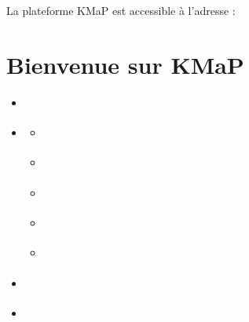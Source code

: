 \documentclass[letterpaper,10pt,english]{sphinxmanual}
\begin{document}
\sphinxAtStartPar
La plateforme KMaP est accessible à l’adresse : 

\sphinxstepscope


\section{Bienvenue sur KMaP}
\label{\detokenize{fr/01_bienvenue:bienvenue-sur-kmap}}\label{\detokenize{fr/01_bienvenue:welcome-fr}}\label{\detokenize{fr/01_bienvenue::doc}}
\begin{sphinxcontents}
\begin{itemize}
\item {} 
\sphinxAtStartPar
{}\label{\detokenize{fr/01_bienvenue:id1}}{\hyperref[\detokenize{fr/01_bienvenue:qu-est-ce-que-kmap}]{}}

\item {} 
\sphinxAtStartPar
{}\label{\detokenize{fr/01_bienvenue:id2}}{\hyperref[\detokenize{fr/01_bienvenue:types-de-ressources}]{}}
\begin{itemize}
\item {} 
\sphinxAtStartPar
{}\label{\detokenize{fr/01_bienvenue:id3}}{\hyperref[\detokenize{fr/01_bienvenue:jeu-de-donnees-dataset}]{}}

\item {} 
\sphinxAtStartPar
{}\label{\detokenize{fr/01_bienvenue:id4}}{\hyperref[\detokenize{fr/01_bienvenue:document}]{}}

\item {} 
\sphinxAtStartPar
{}\label{\detokenize{fr/01_bienvenue:id5}}{\hyperref[\detokenize{fr/01_bienvenue:carte-map}]{}}

\item {} 
\sphinxAtStartPar
{}\label{\detokenize{fr/01_bienvenue:id6}}{\hyperref[\detokenize{fr/01_bienvenue:geostory}]{}}

\item {} 
\sphinxAtStartPar
{}\label{\detokenize{fr/01_bienvenue:id7}}{\hyperref[\detokenize{fr/01_bienvenue:tableau-de-bord-dashboard}]{}}

\end{itemize}

\item {} 
\sphinxAtStartPar
{}\label{\detokenize{fr/01_bienvenue:id8}}{\hyperref[\detokenize{fr/01_bienvenue:services-interoperables}]{}}

\item {} 
\sphinxAtStartPar
{}\label{\detokenize{fr/01_bienvenue:id9}}{\hyperref[\detokenize{fr/01_bienvenue:thematiques-disponibles-sur-kmap}]{}}

\end{itemize}
\end{sphinxcontents}
\end{document}
